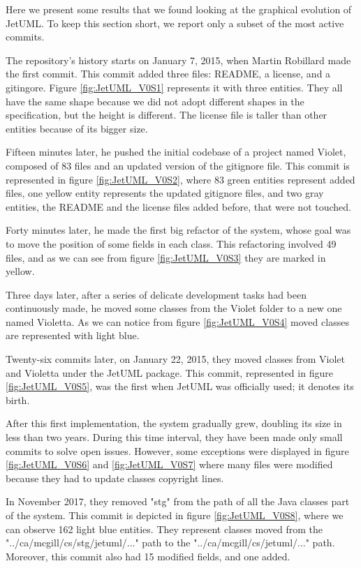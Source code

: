Here we present some results that we found looking at the graphical evolution of JetUML. 
To keep this section short, we report only a subset of the most active commits. 

The repository's history starts on January 7, 2015, when Martin Robillard made the first commit. 
This commit added three files: README, a license, and a gitingore. 
Figure \ref{fig:JetUML_V0S1} represents it with three entities. They all have the same shape because we did not adopt different shapes in the specification, but the height is different. The license file is taller than other entities because of its bigger size. 

Fifteen minutes later, he pushed the initial codebase of a project named Violet, composed of 83 files and an updated version of the gitignore file. This commit is represented in figure \ref{fig:JetUML_V0S2}, where 83 green entities represent added files, one yellow entity represents the updated gitignore files, and two gray entities, the README and the license files added before, that were not touched.

Forty minutes later, he made the first big refactor of the system, whose goal was to move the position of some fields in each class. This refactoring involved 49 files, and as we can see from figure \ref{fig:JetUML_V0S3} they are marked in yellow. 

Three days later, after a series of delicate development tasks had been continuously made, he moved some classes from the Violet folder to a new one named Violetta. As we can notice from figure \ref{fig:JetUML_V0S4} moved classes are represented with light blue. 

Twenty-six commits later, on January 22, 2015, they moved classes from Violet and Violetta under the JetUML package. This commit, represented in figure \ref{fig:JetUML_V0S5}, was the first when JetUML was officially used; it denotes its birth. 

After this first implementation, the system gradually grew, doubling its size in less than two years. 
During this time interval, they have been made only small commits to solve open issues. However, some exceptions were displayed in figure \ref{fig:JetUML_V0S6} and \ref{fig:JetUML_V0S7} where many files were modified because they had to update classes copyright lines. 

In November 2017, they removed "stg" from the path of all the Java classes part of the system. This commit is depicted in figure \ref{fig:JetUML_V0S8}, where we can observe 162 light blue entities. They represent classes moved from the "../ca/mcgill/cs/stg/jetuml/..." path to the 
"../ca/mcgill/cs/jetuml/..." path. Moreover, this commit also had 15 modified fields, and one added. 


